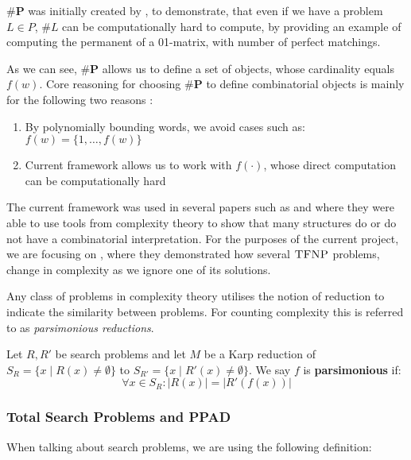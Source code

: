 $\textbf{\#P}$ was initially created by \cite{valiantComplexityComputingPermanent1979},
to demonstrate, that even if we have a problem $L \in P$, $\#L$ can be computationally
hard to compute, by providing an example of computing the permanent of
a 01-matrix, with number of perfect matchings. 

As we can see, $\textbf{\#P}$ allows us to define a set of objects,
whose cardinality equals $f(w)$. Core reasoning for choosing
$\textbf{\#P}$ to define combinatorial objects is mainly for the 
following two reasons \cite{ikenmeyerPositivitySymmetricGroup2024}: 

\begin{enumerate}
    \item By polynomially bounding words, we avoid cases such as: $f(w) = \{1, \hdots, f(w)\}$
    \item Current framework allows us to work with $f(\cdot)$, whose direct computation can be computationally hard
\end{enumerate}


The current framework was used in several papers such as
\cite{ikenmeyerWhatWhatNot2022} and \cite{ikenmeyerPositivitySymmetricGroup2024}
where they were able to use tools from complexity theory to show that
many structures do or do not have a combinatorial interpretation.
For the purposes of the current project, we are focusing on \cite{ikenmeyerWhatWhatNot2022},
where they demonstrated how several $\textsc{TFNP}$ problems, 
change in complexity as we ignore one of its solutions.


Any class of problems in complexity theory utilises the notion of reduction
to indicate the similarity between problems. For counting complexity
this is referred to as \textit{parsimonious reductions}.


\begin{definition}
    Let $R, R'$ be search problems and let $M$ be a Karp reduction of
    $S_R = \{x \mid R(x) \neq \emptyset \}$ to $S_{R'} = \{x \mid R'(x) \neq \emptyset \}$.
    We say $f$ is \textbf{parsimonious} if:
    $$
    \forall x \in S_R : |R(x)| = |R'(f(x))|
    $$ 
\end{definition}

\subsubsection{Total Search Problems and PPAD}
When talking about search problems, we are using the following definition:

